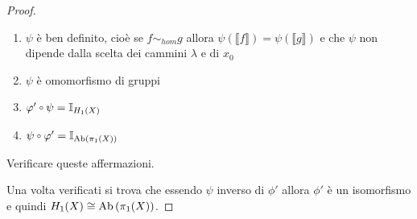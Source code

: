 \begin{proof}
  \begin{enumerate}
  \item $ \psi $ è ben definito, cioè se $ f \sim_{hom} g $ allora $ \psi( \llbracket f \rrbracket ) = \psi( \llbracket g \rrbracket ) $ e che $ \psi $
    non dipende dalla scelta dei cammini $ \lambda $ e di $ x_0 $
  \item $ \psi $ è omomorfismo di gruppi
  \item $ \phi' \circ \psi = \Id{H_1(X)} $
  \item $ \psi \circ \phi' = \Id{\Ab{\pi_1(X)}} $
  \end{enumerate}
  \begin{exercise}
    Verificare queste affermazioni.
  \end{exercise}
  Una volta verificati si trova che essendo $ \psi $ inverso di $ \phi'$ allora
  $ \phi'$ è un isomorfismo e quindi $ H_1(X) \cong \mathrm{Ab}\left( \pi_1(X) \right) $.
\end{proof}

